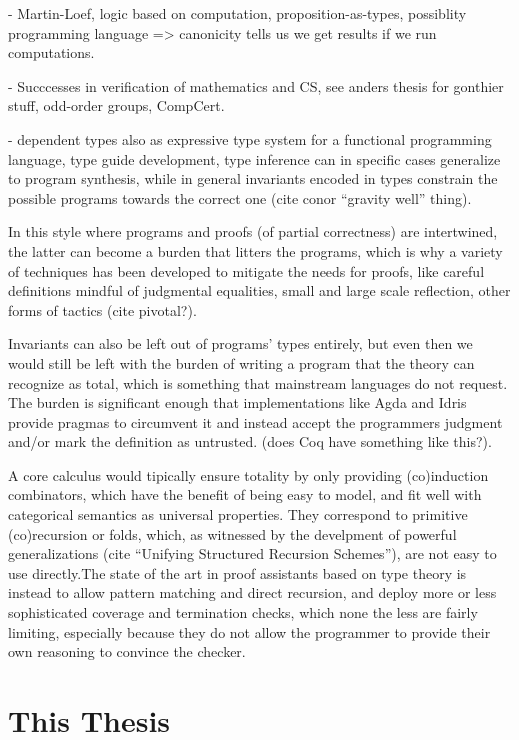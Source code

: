 - Martin-Loef, logic based on computation, proposition-as-types,
possiblity programming language => canonicity tells us we get results
if we run computations.

  - Succcesses in verification of mathematics and CS, see anders thesis for gonthier stuff, odd-order groups, CompCert.

  - dependent types also as expressive type system for a functional
  programming language, type guide development, type inference can in
  specific cases generalize to program synthesis, while in general
  invariants encoded in types constrain the possible programs towards
  the correct one (cite conor ``gravity well'' thing).
  
  In this style where programs and proofs (of partial correctness) are
  intertwined, the latter can become a burden that litters the
  programs, which is why a variety of techniques has been developed to
  mitigate the needs for proofs, like careful definitions mindful of judgmental equalities, small and
  large scale reflection, other forms of tactics (cite pivotal?).
    
  Invariants can also be left out of programs' types entirely, but
  even then we would still be left with the burden of writing a
  program that the theory can recognize as total, which is something
  that mainstream languages do not request. The burden is significant
  enough that implementations like Agda and Idris provide pragmas to
  circumvent it and instead accept the programmers judgment and/or
  mark the definition as untrusted. (does Coq have something like this?).

  A core calculus would tipically ensure totality by only providing
  (co)induction combinators, which have the benefit of being easy to
  model, and fit well with categorical semantics as universal
  properties.  They correspond to primitive (co)recursion or folds,
  which, as witnessed by the develpment of powerful generalizations
  (cite ``Unifying Structured Recursion Schemes''), are not easy to
  use directly.The state of the art in proof assistants based on type
  theory is instead to allow pattern matching and direct recursion,
  and deploy more or less sophisticated coverage and termination
  checks, which none the less are fairly limiting, especially because
  they do not allow the programmer to provide their own reasoning to
  convince the checker.
  

\section{This Thesis}
  
